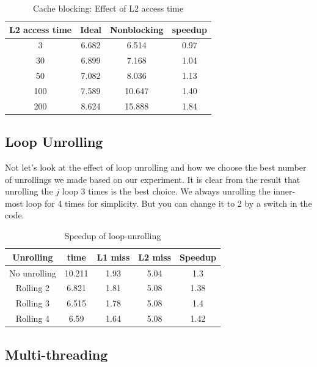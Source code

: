 \documentclass[twocolumn,letterpaper,10pt]{article}
\begin{document}
\begin{table}[ht!]
\begin{center}
\begin{tabular}{cccc}
\toprule
L2 access time & Ideal	& Nonblocking & speedup\\
\midrule
3 &	6.682 & 6.514 & 0.97 \\ 
30 & 6.899  & 7.168 & 1.04 \\ 
50	& 7.082	& 8.036 & 1.13  \\ 
100	& 7.589	& 10.647 & 1.40 \\ 
200	& 8.624	& 15.888 & 1.84\\
\bottomrule
\end{tabular}
\end{center}
\caption{Cache blocking: Effect of L2 access time}
\end{table}


\subsection{Loop Unrolling}

Not let's look at the effect of loop unrolling and how we choose the
best number of unrollings we made based on our experiment. It is clear
from the result that unrolling the $j$ loop 3 times is the best
choice. We always unrolling the inner-most loop for 4 times for
simplicity. But you can change it to 2 by a switch in the code.

\begin{table}[ht!]
\begin{center}
\begin{tabular}{ccccc}
\toprule
Unrolling & time & L1 miss  & L2 miss & Speedup \\
\midrule
No unrolling & 10.211 & 1.93 & 5.04	& 1.3 \\
Rolling 2 & 6.821 & 1.81 & 5.08 & 1.38 \\
Rolling 3 & 6.515 & 1.78 & 5.08 & 1.4 \\
Rolling 4 &	6.59 & 1.64	& 5.08 & 1.42 \\
\bottomrule
\end{tabular}
\end{center}
\caption{Speedup of loop-unrolling}
\label{fig:unrolling}
\end{table}


\subsection{Multi-threading}
\end{document}
